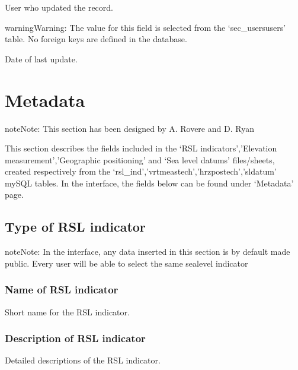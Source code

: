 \documentclass[letterpaper,10pt,english]{sphinxmanual}
\begin{document}
 \sphinxhyphen{} User who updated the record.

\begin{sphinxadmonition}{warning}{Warning:}
The value for this field is selected from the ‘sec\_usersusers’ table. No foreign keys are defined in the database.
\end{sphinxadmonition}

 \sphinxhyphen{} Date of last update.


\chapter{Metadata}
\label{\detokenize{Metadata:metadata}}\label{\detokenize{Metadata::doc}}
\begin{sphinxadmonition}{note}{Note:}
This section has been designed by A. Rovere and D. Ryan
\end{sphinxadmonition}

This section describes the fields included in the ‘RSL indicators’,’Elevation measurement’,’Geographic positioning’ and ‘Sea level datums’ files/sheets, created respectively from the ‘rsl\_ind’,’vrtmeastech’,’hrzpostech’,’sldatum’ mySQL tables. In the interface, the fields below can be found under ‘Metadata’ page.


\section{Type of RSL indicator}
\label{\detokenize{Metadata:type-of-rsl-indicator}}
\begin{sphinxadmonition}{note}{Note:}
In the interface, any data inserted in this section is by default made public. Every user will be able to select the same sea\sphinxhyphen{}level indicator
\end{sphinxadmonition}


\subsection{Name of RSL indicator}
\label{\detokenize{Metadata:name-of-rsl-indicator}}
Short name for the RSL indicator.


\subsection{Description of RSL indicator}
\label{\detokenize{Metadata:description-of-rsl-indicator}}
Detailed descriptions of the RSL indicator.
\end{document}
